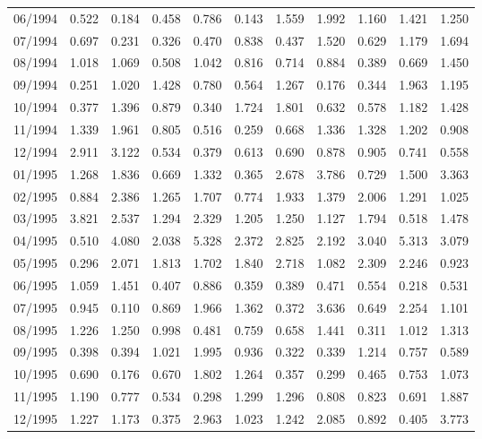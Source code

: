 \begin{tabular}{lrrrrrrrrrr}
06/1994 &  0.522 &  0.184 &  0.458 &  0.786 &  0.143 &  1.559 &  1.992 &  1.160 &  1.421 &  1.250 \\
07/1994 &  0.697 &  0.231 &  0.326 &  0.470 &  0.838 &  0.437 &  1.520 &  0.629 &  1.179 &  1.694 \\
08/1994 &  1.018 &  1.069 &  0.508 &  1.042 &  0.816 &  0.714 &  0.884 &  0.389 &  0.669 &  1.450 \\
09/1994 &  0.251 &  1.020 &  1.428 &  0.780 &  0.564 &  1.267 &  0.176 &  0.344 &  1.963 &  1.195 \\
10/1994 &  0.377 &  1.396 &  0.879 &  0.340 &  1.724 &  1.801 &  0.632 &  0.578 &  1.182 &  1.428 \\
11/1994 &  1.339 &  1.961 &  0.805 &  0.516 &  0.259 &  0.668 &  1.336 &  1.328 &  1.202 &  0.908 \\
12/1994 &  2.911 &  3.122 &  0.534 &  0.379 &  0.613 &  0.690 &  0.878 &  0.905 &  0.741 &  0.558 \\
01/1995 &  1.268 &  1.836 &  0.669 &  1.332 &  0.365 &  2.678 &  3.786 &  0.729 &  1.500 &  3.363 \\
02/1995 &  0.884 &  2.386 &  1.265 &  1.707 &  0.774 &  1.933 &  1.379 &  2.006 &  1.291 &  1.025 \\
03/1995 &  3.821 &  2.537 &  1.294 &  2.329 &  1.205 &  1.250 &  1.127 &  1.794 &  0.518 &  1.478 \\
04/1995 &  0.510 &  4.080 &  2.038 &  5.328 &  2.372 &  2.825 &  2.192 &  3.040 &  5.313 &  3.079 \\
05/1995 &  0.296 &  2.071 &  1.813 &  1.702 &  1.840 &  2.718 &  1.082 &  2.309 &  2.246 &  0.923 \\
06/1995 &  1.059 &  1.451 &  0.407 &  0.886 &  0.359 &  0.389 &  0.471 &  0.554 &  0.218 &  0.531 \\
07/1995 &  0.945 &  0.110 &  0.869 &  1.966 &  1.362 &  0.372 &  3.636 &  0.649 &  2.254 &  1.101 \\
08/1995 &  1.226 &  1.250 &  0.998 &  0.481 &  0.759 &  0.658 &  1.441 &  0.311 &  1.012 &  1.313 \\
09/1995 &  0.398 &  0.394 &  1.021 &  1.995 &  0.936 &  0.322 &  0.339 &  1.214 &  0.757 &  0.589 \\
10/1995 &  0.690 &  0.176 &  0.670 &  1.802 &  1.264 &  0.357 &  0.299 &  0.465 &  0.753 &  1.073 \\
11/1995 &  1.190 &  0.777 &  0.534 &  0.298 &  1.299 &  1.296 &  0.808 &  0.823 &  0.691 &  1.887 \\
12/1995 &  1.227 &  1.173 &  0.375 &  2.963 &  1.023 &  1.242 &  2.085 &  0.892 &  0.405 &  3.773 \\

\end{tabular}
